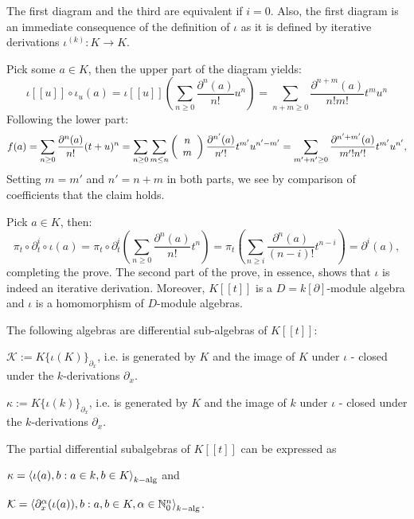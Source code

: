 \bws The first diagram and the third are equivalent if $i = 0$. Also, the first diagram is an immediate consequence of the definition of $\iota$ as it is defined by iterative derivations $\iota^{(k)} : K \longrightarrow K$.
\bn
\item Pick some $a \in K$, then the upper part of the diagram yields:
$$\iota[[u]] \circ \iota_u(a) = \iota[[u]]\left(\sum_{n\geq 0} \frac{\partial^n(a)}{n!} u^n\right) = \sum_{n + m\geq0} \frac{\partial^{n+m}(a)}{n!m!} t^m u^n$$
Following the lower part:
$$f(a) = \sum_{n\geq0} \frac{\partial^n(a)}{n!}(t + u)^n = \sum_{n\geq0} \sum_{m \leq n}\left(\bao{c}
n\\
m\\
\ea\right) \frac{\partial^{n'}(a)}{n'!} t^{m'} u^{n'-m'} = \sum_{m'+n'\geq0} \frac{\partial^{n'+m'}(a)}{m'! n'!} t^{m'} u^{n'},$$
Setting $m = m'$ and $n' = n + m$ in both parts, we see by comparison of coefficients that the claim holds.
\item Pick $a \in K$, then:
$$\pi_t \circ \partial_t^i\circ\iota(a) = \pi_t \circ \partial_t^i\left(\sum_{n\geq0} \frac{\partial^n(a)}{n!} t^n\right) = \pi_t\left(\sum_{n \geq i} \frac{ \partial^n(a)}{(n - i)!} t^{n-i}\right) = \partial^i(a),$$
completing the prove.
\en
\bmk The second part of the prove, in essence, shows that $\iota$ is indeed an iterative derivation. Moreover, $K[[t]]$ is a $D = k[\partial]$-module algebra and $\iota$ is a homomorphism of $D$-module algebras.
\begin{defi}
The following algebras are differential sub-algebras of $K[[t]]$:
\bn
\item $\mathcal{K} := K\{\iota(K)\}_{\partial_x}$, i.e. is generated by $K$ and the image of $K$ under $\iota$ - closed under the $k$-derivations $\partial_x$.
\item $\kappa := K\{\iota(k)\}_{\partial_x}$, i.e. is generated by $K$ and the image of $k$ under $\iota$ - closed under the $k$-derivations $\partial_x$.
\en
\end{defi}
\bmk The partial differential subalgebras of $K[[t]]$ can be expressed as
\bn
\item $\kappa = \left<\iota(a), b : a \in k, b \in K\right>_{k-\trm{alg}}$ and
\item $\mathcal{K} = \left<\partial_x^{\alpha}(\iota(a)), b : a, b \in K, \alpha \in \nz_0^n\right>_{k-\trm{alg}}$.
\en
